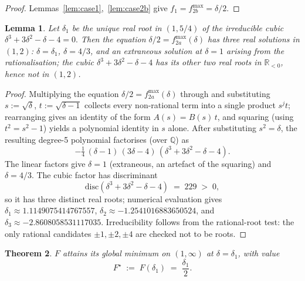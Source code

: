 \documentclass[11pt,a4paper]{article}
\newtheorem{theorem}{Theorem}
\newtheorem{lemma}[theorem]{Lemma}
\theoremstyle{definition}
\newcommand{\QQ}{\mathbb{Q}}
\newcommand{\RR}{\mathbb{R}}
\begin{document}
\begin{proof}
Lemmas~\ref{lem:case1},~\ref{lem:case2b} give $f_1=f_{2b}^{\max}=\delta/2$.
\end{proof}

\begin{lemma}\label{lem:cubic}
Let $\delta_1$ be the unique real root in $(1,5/4)$ of the irreducible
cubic
\(
   \delta^3+3\delta^2-\delta-4=0.
\)
Then the equation $\delta/2=f_{2a}^{\max}(\delta)$ has three real
solutions in $(1,2)$: $\delta=\delta_1$, $\delta=4/3$, and an extraneous
solution at $\delta=1$ arising from the rationalisation; the cubic
$\delta^3+3\delta^2-\delta-4$ has its other two real roots in
$\RR_{<0}$, hence not in $(1,2)$.
\end{lemma}

\begin{proof}
Multiplying the equation $\delta/2=f_{2a}^{\max}(\delta)$ through and
substituting $s:=\sqrt\delta$, $t:=\sqrt{\delta-1}$ collects every
non-rational term into a single product $s^j t$; rearranging gives an
identity of the form $A(s)=B(s)\,t$, and squaring (using $t^2=s^2-1$)
yields a polynomial identity in $s$ alone. After substituting $s^2=\delta$,
the resulting degree-5 polynomial factorises (over $\QQ$) as
\begin{equation}\label{eq:factor}
   -\tfrac{1}{4}\,(\delta-1)\,(3\delta-4)\,(\delta^3+3\delta^2-\delta-4).
\end{equation}
The linear factors give $\delta=1$ (extraneous, an artefact of the
squaring) and $\delta=4/3$. The cubic factor has discriminant
\[
   \mathrm{disc}(\delta^3+3\delta^2-\delta-4) \;=\; 229 \;>\;0,
\]
so it has three distinct real roots; numerical evaluation gives
$\delta_1\approx1.1149075414767557$,
$\delta_2\approx-1.2541016883650524$, and
$\delta_3\approx-2.8608058531117035$. Irreducibility follows from the
rational-root test: the only rational candidates $\pm1,\pm2,\pm4$ are
checked not to be roots.
\end{proof}

\begin{theorem}\label{thm:Foptimum}
$F$ attains its global minimum on $(1,\infty)$ at $\delta=\delta_1$,
with value
\[
   F^{\star} \;:=\; F(\delta_1) \;=\; \frac{\delta_1}{2}.
\]
\end{theorem}
\end{document}
